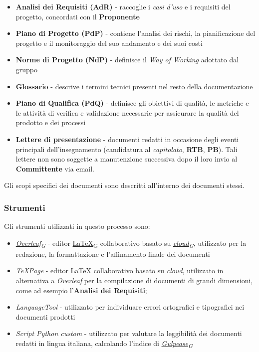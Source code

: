 \documentclass[12pt, a4paper]{article}
\newcommand{\urlglossario}{https://skynetunigroup.github.io/Code_Guardian/Documentazione/PB/glossario_v2.0.0.pdf} %
\newcommand{\glo}[2]{\href{\urlglossario\#nameddest=#2}{#1\textsubscript{G}}}
\begin{document}
\begin{itemize}
    \item \textbf{Analisi dei Requisiti (AdR)} - raccoglie i \textit{casi d'uso} e i requisiti del progetto, concordati con il \textbf{Proponente}

    \item \textbf{Piano di Progetto (PdP)} - contiene l'analisi dei rischi, la pianificazione del progetto e il monitoraggio del suo andamento e dei suoi costi

    \item \textbf{Norme di Progetto (NdP)} - definisce il \textit{Way of Working} adottato dal gruppo

    \item \textbf{Glossario} - descrive i termini tecnici presenti nel resto della documentazione

    \item \textbf{Piano di Qualifica (PdQ)} - definisce gli obiettivi di qualità, le metriche e le attività di verifica e validazione necessarie per assicurare la qualità del prodotto e dei processi

    \item \textbf{Lettere di presentazione} - documenti redatti in occasione degli eventi principali dell'insegnamento (candidatura al \textit{capitolato}, \textbf{RTB}, \textbf{PB}). Tali lettere non sono soggette a manutenzione successiva dopo il loro invio al \textbf{Committente} via email.
\end{itemize}

Gli scopi specifici dei documenti sono descritti all'interno dei documenti stessi.

\subsubsection{Strumenti}
Gli strumenti utilizzati in questo processo sono:

\begin{itemize}
    \item \textit{\glo{Overleaf}{overleaf}} - editor \glo{\LaTeX{}}{latex} collaborativo basato su \textit{\glo{cloud}{cloud}}, utilizzato per la redazione, la formattazione e l'affinamento finale dei documenti

    \item \textit{TeXPage} - editor \LaTeX{} collaborativo basato su \textit{{cloud}}, utilizzato in alternativa a \textit{Overleaf} per la compilazione di documenti di grandi dimensioni, come ad esempio l'\textbf{Analisi dei Requisiti};

    \item \textit{LanguageTool} - utilizzato per individuare errori ortografici e tipografici nei documenti prodotti

    \item \textit{Script Python custom} - utilizzato per valutare la leggibilità dei documenti redatti in lingua italiana, calcolando l'indice di \textit{\glo{Gulpease}{gulpease}}
\end{itemize}
\end{document}
